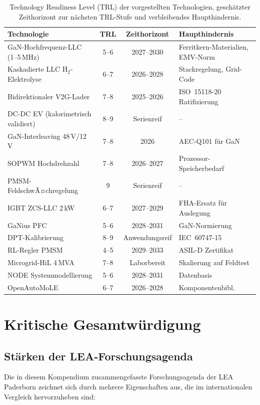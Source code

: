 ﻿\documentclass[a4paper,12pt,openany,oneside]{book}
\newcommand{\abschnitt}[1]{\section{#1}}
\newcommand{\unterabschnitt}[1]{\subsection{#1}}
\theoremstyle{definition}
\begin{document}
\begin{table}[H]
\centering
\renewcommand{\arraystretch}{1.35}
\begin{tabular}{p{4.0cm}ccp{3.5cm}}
\toprule
\textbf{Technologie} & \textbf{TRL} & \textbf{Zeithorizont} & \textbf{Haupthindernis} \\
\midrule
GaN-Hochfrequenz-LLC (1--5\,MHz) & 5--6 & 2027--2030 &
  Ferritkern-Materialien, EMV-Norm \\
Kaskadierte LLC H$_2$-Elektrolyse & 6--7 & 2026--2028 &
  Stackregelung, Grid-Code \\
Bidirektionaler V2G-Lader & 7--8 & 2025--2026 &
  ISO~15118-20 Ratifizierung \\
DC-DC EV (kalorimetrisch validiert) & 8--9 & Serienreif &
  -- \\
GaN-Interleaving 48\,V/12\,V & 7--8 & 2026 &
  AEC-Q101 f\"ur GaN \\
SOPWM Hochdrehzahl & 7--8 & 2026--2027 &
  Prozessor-Speicherbedarf \\
PMSM-FeldschwÃ¤chregelung & 9 & Serienreif &
  -- \\
IGBT ZCS-LLC 2\,kW & 6--7 & 2027--2029 &
  FHA-Ersatz f\"ur Auslegung \\
GaNius PFC & 5--6 & 2028--2031 & GaN-Normierung \\
DPT-Kalibrierung & 8--9 & Anwendungsreif & IEC~60747-15 \\
RL-Regler PMSM & 4--5 & 2029--2033 & ASIL-D Zertifikat \\
Microgrid-HiL 4\,MVA & 7--8 & Laborbereit &
  Skalierung auf Feldtest \\
NODE Systemmodellierung & 5--6 & 2028--2031 & Datenbasis \\
OpenAutoMoLE & 6--7 & 2026--2028 & Komponentenbibl. \\
\bottomrule
\end{tabular}
\caption{Technology Readiness Level (TRL) der vorgestellten Technologien,
         gesch\"atzter Zeithorizont zur n\"achsten TRL-Stufe und verbleibendes
         Haupthindernis.}
\label{tab:trl}
\end{table}

\abschnitt{Kritische Gesamtw\"urdigung}

\unterabschnitt{St\"arken der LEA-Forschungsagenda}

Die in diesem Kompendium zusammengefasste Forschungsagenda der LEA Paderborn zeich\-net
sich durch mehrere Eigenschaften aus, die im internationalen Vergleich hervorzuheben sind:
\end{document}
